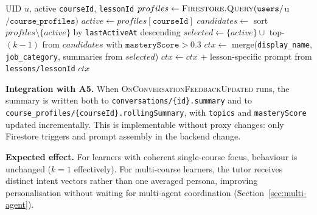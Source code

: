 \begin{algorithm}[H]
\caption{BuildSessionContext}
\label{alg:context}
\begin{algorithmic}[1]
\Require UID $u$, active \texttt{courseId}, \texttt{lessonId}
\State $profiles \gets \textsc{Firestore.Query}(\texttt{users}/$u$/\texttt{course\_profiles})$
\State $active \gets profiles[\texttt{courseId}]$
\State $candidates \gets$ sort $profiles \setminus \{active\}$ by \texttt{lastActiveAt} descending
\State $selected \gets \{active\} \cup$ top-$(k-1)$ from $candidates$ with $\texttt{masteryScore} > 0.3$
\State $ctx \gets$ merge(\texttt{display\_name}, \texttt{job\_category}, summaries from $selected$)
\State $ctx \gets ctx$ + lesson-specific prompt from \texttt{lessons/lessonId}
\State \Return $ctx$ 
\end{algorithmic}
\end{algorithm}

\textbf{Integration with A5.} When \textsc{OnConversationFeedbackUpdated} runs, the summary is written both to \texttt{conversations/\{id\}.summary} and to \texttt{course\_profiles/\{courseId\}.rollingSummary}, with \texttt{topics} and \texttt{masteryScore} updated incrementally. This is implementable without proxy changes: only Firestore triggers and prompt assembly in the backend change.

\textbf{Expected effect.} For learners with coherent single-course focus, behaviour is unchanged ($k=1$ effectively). For multi-course learners, the tutor receives distinct intent vectors rather than one averaged persona, improving personalisation without waiting for multi-agent coordination (Section~\ref{sec:multi-agent}).
